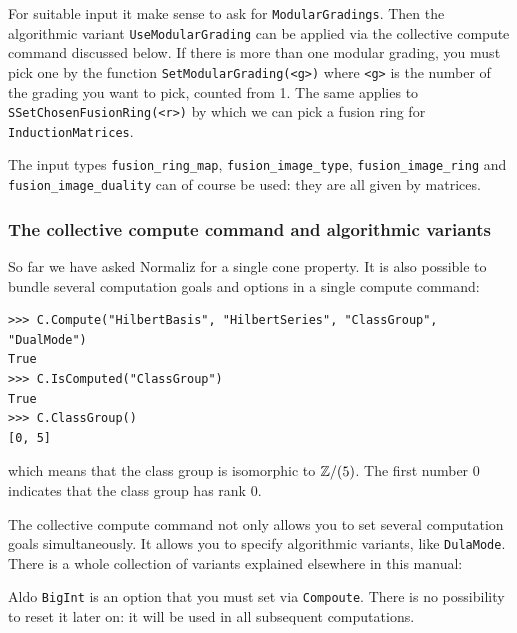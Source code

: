 \begin{small}
For suitable input it make sense to ask for \verb*|ModularGradings|. Then the algorithmic variant \verb*|UseModularGrading| can be applied via the collective compute command discussed below. If there is more than one modular grading, you must pick one by the function \verb*|SetModularGrading(<g>)| where  \verb*|<g>| is the number of the grading you want to pick, counted from 1. The same applies to \verb*|SSetChosenFusionRing(<r>)| by which we can pick a fusion ring for \verb*|InductionMatrices|.

The input types \verb*|fusion_ring_map|, \verb*|fusion_image_type|, \verb*|fusion_image_ring| and \verb*|fusion_image_duality| can of course be used: they are all given by matrices.

\subsubsection{The collective compute command and algorithmic variants}\label{CollComp}
So far we have asked Normaliz for a single cone property. It is also possible to bundle several computation goals and options in a single compute command:
\begin{Verbatim}
>>> C.Compute("HilbertBasis", "HilbertSeries", "ClassGroup", "DualMode")
True
>>> C.IsComputed("ClassGroup")
True
>>> C.ClassGroup()
[0, 5]
\end{Verbatim}
which means that the class group is isomorphic to ${\mathbb Z}/(5)$. The first number $0$ indicates that the class group has rank $0$.

The collective compute command not only allows you to set several computation goals simultaneously. It allows you to specify algorithmic variants, like \verb|DulaMode|. There is a whole collection of variants explained elsewhere in this manual:


Aldo \verb*|BigInt| is an option that you must set via \verb*|Compoute|. There is no possibility to reset it later on: it will be used in all subsequent computations.


\end{small}
